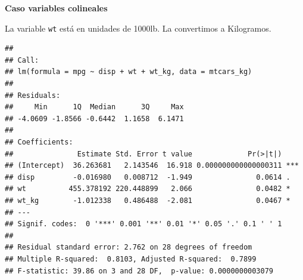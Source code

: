 \documentclass[
  12pt,
]{book}
\newenvironment{Shaded}{\begin{snugshade}}{\end{snugshade}}
\newcommand{\DataTypeTok}[1]{\textcolor[rgb]{0.13,0.29,0.53}{#1}}
\newcommand{\DecValTok}[1]{\textcolor[rgb]{0.00,0.00,0.81}{#1}}
\newcommand{\FloatTok}[1]{\textcolor[rgb]{0.00,0.00,0.81}{#1}}
\newcommand{\KeywordTok}[1]{\textcolor[rgb]{0.13,0.29,0.53}{\textbf{#1}}}
\newcommand{\NormalTok}[1]{#1}
\newcommand{\OperatorTok}[1]{\textcolor[rgb]{0.81,0.36,0.00}{\textbf{#1}}}
\newcommand{\StringTok}[1]{\textcolor[rgb]{0.31,0.60,0.02}{#1}}
\theoremstyle{definition}
\theoremstyle{definition}
\theoremstyle{definition}
\theoremstyle{remark}
\begin{document}
\textbf{Caso variables colineales}

La variable \texttt{wt} está en unidades de 1000lb. La convertimos a Kilogramos.

\begin{Shaded}
\end{Shaded}

\begin{verbatim}
## 
## Call:
## lm(formula = mpg ~ disp + wt + wt_kg, data = mtcars_kg)
## 
## Residuals:
##     Min      1Q  Median      3Q     Max 
## -4.0609 -1.8566 -0.6442  1.1658  6.1471 
## 
## Coefficients:
##               Estimate Std. Error t value             Pr(>|t|)    
## (Intercept)  36.263681   2.143546  16.918 0.000000000000000311 ***
## disp         -0.016980   0.008712  -1.949               0.0614 .  
## wt          455.378192 220.448899   2.066               0.0482 *  
## wt_kg        -1.012338   0.486488  -2.081               0.0467 *  
## ---
## Signif. codes:  0 '***' 0.001 '**' 0.01 '*' 0.05 '.' 0.1 ' ' 1
## 
## Residual standard error: 2.762 on 28 degrees of freedom
## Multiple R-squared:  0.8103, Adjusted R-squared:  0.7899 
## F-statistic: 39.86 on 3 and 28 DF,  p-value: 0.0000000003079
\end{verbatim}

\begin{Shaded}
\end{Shaded}
\end{document}
